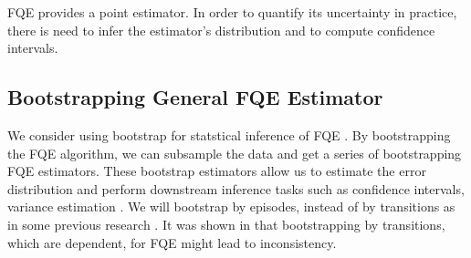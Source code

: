 \documentclass{article}
\numberwithin{equation}{section}
\theoremstyle{plain}
\theoremstyle{definition}
\theoremstyle{remark}
\begin{document}
FQE provides a point estimator. In order to quantify its uncertainty in practice, there is need to infer the estimator's distribution and to compute confidence intervals. 

\subsection{Bootstrapping General FQE Estimator}
We consider using bootstrap for statstical inference of FQE  \citep{efron1982jackknife}. By bootstrapping the FQE algorithm, we can subsample the data and get a series of bootstrapping FQE estimators. These bootstrap estimators allow us to estimate the error distribution and perform downstream inference tasks such as confidence intervals, variance estimation \citep{bootstrap}. We will bootstrap by episodes, instead of by transitions as in some previous research \citep{kostrikov2020statistical}. It was shown in \citep{bootstrap} that bootstrapping by transitions, which are dependent, for FQE might lead to inconsistency. %
\end{document}
